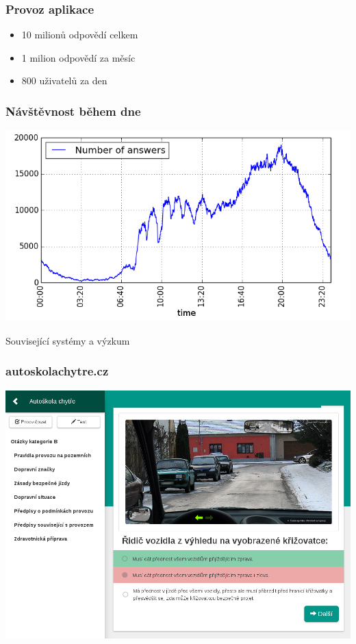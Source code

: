 \documentclass[xcolor=svgnames]{beamer}
\begin{document}
\begin{frame}
	\frametitle{Provoz aplikace}
  \begin{itemize}
    \item 10 milionů odpovědí celkem
    \item 1 milion odpovědí za měsíc
    \item 800 uživatelů za den
  \end{itemize}
\end{frame}
\begin{frame}
	\frametitle{Návštěvnost během dne}
	 
   \includegraphics[width=\textwidth]{img/answers_in_day_by_minute_absolute.png}
\end{frame}
\begin{frame}
  \huge  Související systémy a výzkum
\end{frame}
\begin{frame}
	\frametitle{autoskolachytre.cz}
	 
   \includegraphics[width=\textwidth]{img/autoskola.png}
\end{frame}
\end{document}
